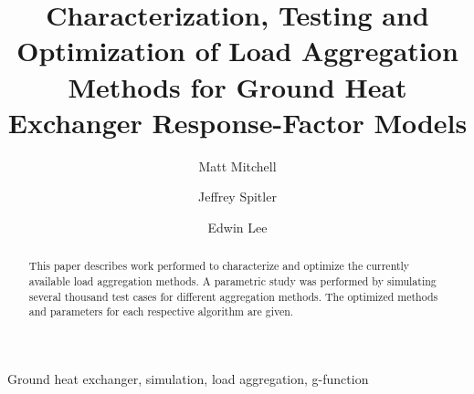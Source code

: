 \documentclass[review,12pt]{elsarticle}
\begin{document}
\begin{frontmatter}


\title{Characterization, Testing and Optimization of Load Aggregation Methods for Ground Heat Exchanger Response-Factor Models}




\author[label1]{Matt Mitchell}
\author[label1]{Jeffrey Spitler}
\author[label2]{Edwin Lee}

\address[label1]{Oklahoma State University, Stillwater OK.}
\address[label2]{National Renewable Energy Laboratory, Golden CO.}


\begin{abstract}
This paper describes work performed to characterize and optimize the currently available load aggregation methods. A parametric study was performed by simulating several thousand test cases for different aggregation methods. The optimized methods and parameters for each respective algorithm are given.
\end{abstract}

\begin{keyword}
Ground heat exchanger, simulation, load aggregation, g-function
\end{keyword}

\end{frontmatter}

\linenumbers
\end{document}
